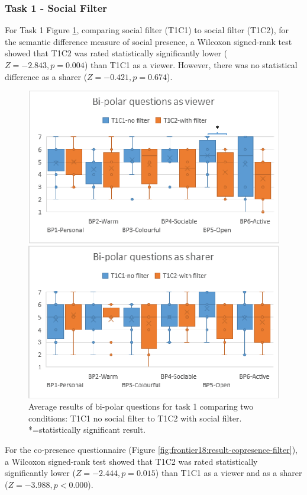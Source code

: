 \subsubsection{Task 1 - Social Filter}

For Task 1 Figure \ref{fig:frontier18:result-bipolar-filter}, comparing social filter (T1C1) to social filter (T1C2), for the semantic difference measure of social presence, a Wilcoxon signed-rank test showed that T1C2 was rated statistically significantly lower ($Z=-2.843, p=0.004$) than T1C1 as a viewer. However, there was no statistical difference as a sharer ($Z=-0.421, p=0.674$).

\begin{figure}[ht]
    \begin{center}
    \includegraphics[width=.8\linewidth]{images/54-hiding-frontier18/images-13.eps}
    \caption{Average results of bi-polar questions for task 1 comparing two conditions: T1C1 no social filter to T1C2 with social filter. *=statistically significant result.}
    \label{fig:frontier18:result-bipolar-filter}
    \end{center}
\end{figure}

For the co-presence questionnaire (Figure \ref{fig:frontier18:result-copresence-filter}), a Wilcoxon signed-rank test showed that T1C2 was rated statistically significantly lower ($Z=-2.444, p=0.015$) than T1C1 as a viewer and as a sharer ($Z=-3.988, p<0.000$).

